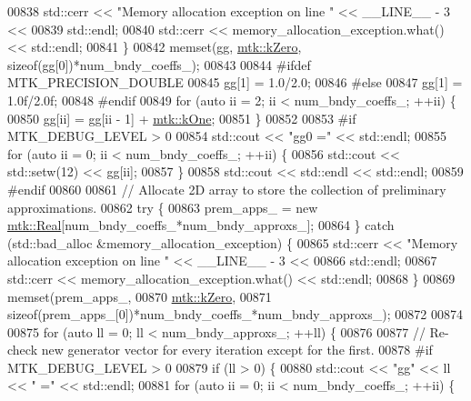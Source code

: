 \begin{DoxyCode}
{{00838     std::cerr << \textcolor{stringliteral}{"Memory allocation exception on line "} << \_\_LINE\_\_ - 3 <<
00839       std::endl;
00840     std::cerr << memory\_allocation\_exception.what() << std::endl;
00841   \}
00842   memset(gg, \hyperlink{group__c01-roots_ga59a451a5fae30d59649bcda274fea271}{mtk::kZero}, \textcolor{keyword}{sizeof}(gg[0])*num\_bndy\_coeffs\_);
00843 
00844 \textcolor{preprocessor}{  #ifdef MTK\_PRECISION\_DOUBLE}
00845   gg[1] = 1.0/2.0;
00846 \textcolor{preprocessor}{  #else}
00847   gg[1] = 1.0f/2.0f;
00848 \textcolor{preprocessor}{  #endif}
00849   \textcolor{keywordflow}{for} (\textcolor{keyword}{auto} ii = 2; ii < num\_bndy\_coeffs\_; ++ii) \{
00850     gg[ii] = gg[ii - 1] + \hyperlink{group__c01-roots_ga26407c24d43b6b95480943340d285c71}{mtk::kOne};
00851   \}
00852 
00853 \textcolor{preprocessor}{  #if MTK\_DEBUG\_LEVEL > 0}
00854   std::cout << \textcolor{stringliteral}{"gg0 ="} << std::endl;
00855   \textcolor{keywordflow}{for} (\textcolor{keyword}{auto} ii = 0; ii < num\_bndy\_coeffs\_; ++ii) \{
00856     std::cout << std::setw(12) << gg[ii];
00857   \}
00858   std::cout << std::endl << std::endl;
00859 \textcolor{preprocessor}{  #endif}
00860 
00861   \textcolor{comment}{// Allocate 2D array to store the collection of preliminary approximations.}
00862   \textcolor{keywordflow}{try} \{
00863     prem\_apps\_ = \textcolor{keyword}{new} \hyperlink{group__c01-roots_gac080bbbf5cbb5502c9f00405f894857d}{mtk::Real}[num\_bndy\_coeffs\_*num\_bndy\_approxs\_];
00864   \} \textcolor{keywordflow}{catch} (std::bad\_alloc &memory\_allocation\_exception) \{
00865     std::cerr << \textcolor{stringliteral}{"Memory allocation exception on line "} << \_\_LINE\_\_ - 3 <<
00866 std::endl;
00867     std::cerr << memory\_allocation\_exception.what() << std::endl;
00868   \}
00869   memset(prem\_apps\_,
00870          \hyperlink{group__c01-roots_ga59a451a5fae30d59649bcda274fea271}{mtk::kZero},
00871          \textcolor{keyword}{sizeof}(prem\_apps\_[0])*num\_bndy\_coeffs\_*num\_bndy\_approxs\_);
00872 
00874 
00875   \textcolor{keywordflow}{for} (\textcolor{keyword}{auto} ll = 0; ll < num\_bndy\_approxs\_; ++ll) \{
00876 
00877     \textcolor{comment}{// Re-check new generator vector for every iteration except for the first.}
00878 \textcolor{preprocessor}{    #if MTK\_DEBUG\_LEVEL > 0}
00879     \textcolor{keywordflow}{if} (ll > 0) \{
00880       std::cout << \textcolor{stringliteral}{"gg"} << ll << \textcolor{stringliteral}{" ="} << std::endl;
00881       \textcolor{keywordflow}{for} (\textcolor{keyword}{auto} ii = 0; ii < num\_bndy\_coeffs\_; ++ii) \{
}}
\end{DoxyCode}
